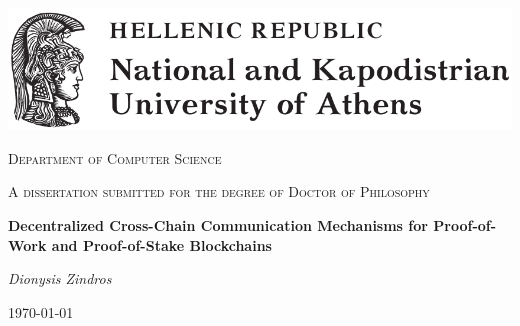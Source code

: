 \documentclass{report}
\begin{document}

\begin{titlepage}
  \centering
  \includegraphics[width=\textwidth]{figures/uoa.pdf}\par\vspace{1cm}
  {\scshape\Large Department of Computer Science\par}
  \vspace{1cm}
  {\scshape A dissertation submitted for the degree of Doctor of Philosophy\par}
  \vspace{1cm}
  {\huge\bfseries Decentralized Cross-Chain Communication Mechanisms for Proof-of-Work and Proof-of-Stake Blockchains\par}
  \vspace{2cm}
  {\Large\itshape Dionysis Zindros\par}
	\vfill
	{\large \today\par}
\end{titlepage}

\newpage

\thispagestyle{empty}
\null

\newpage
\end{document}
